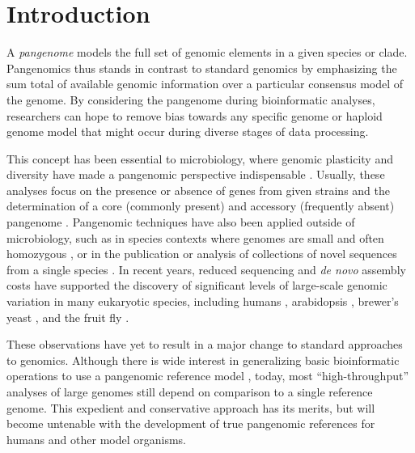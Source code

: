 \section{Introduction}

A \emph{pangenome} models the full set of genomic elements in a given species or clade.
Pangenomics thus stands in contrast to standard genomics by emphasizing the sum total of available genomic information over a particular consensus model of the genome.
By considering the pangenome during bioinformatic analyses, researchers can hope to remove bias towards any specific genome or haploid genome model that might occur during diverse stages of data processing.

This concept has been essential to microbiology, where genomic plasticity and diversity have made a pangenomic perspective indispensable \cite{Vernikos2015}.
Usually, these analyses focus on the presence or absence of genes from given strains and the determination of a core (commonly present) and accessory (frequently absent) pangenome \cite{page2015roary}.
Pangenomic techniques have also been applied outside of microbiology, such as in species contexts where genomes are small and often homozygous \cite{cao2011whole}, or in the publication or analysis of collections of novel sequences from a single species \cite{gao2019tomato,Ou_2018}.
In recent years, reduced sequencing and \emph{de novo} assembly costs have supported the discovery of significant levels of large-scale genomic variation in many eukaryotic species, including humans \cite{sudmant2015integrated,Hehir-Kwa2016-hb,chaisson2018multi,Audano_2019}, arabidopsis \cite{alonso2016arabidopsis}, brewer's yeast \cite{yue2017contrasting}, and the fruit fly \cite{chakraborty2018hidden}.

These observations have yet to result in a major change to standard approaches to genomics.
Although there is wide interest in generalizing basic bioinformatic operations to use a pangenomic reference model \cite{computational2016computational}, today, most ``high-throughput'' analyses of large genomes still depend on comparison to a single reference genome.
This expedient and conservative approach has its merits, but will become untenable with the development of true pangenomic references for humans \cite{Church2015-vt} and other model organisms.

